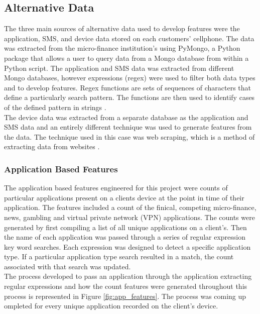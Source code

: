 \subsection{Alternative Data}

The three main sources of alternative data used to develop features were the application, SMS, and device data stored on each customers' cellphone. The data was extracted from the micro-finance institution's using PyMongo, a Python package that allows a user to query data from a Mongo database from within a Python script. The application and SMS data was extracted from different Mongo databases, however expressions (regex) were used to filter both data types and to develop features. Regex functions are sets of sequences of characters that define a particularly search pattern. The functions are then used to identify cases of the defined pattern in strings \parencite{Regex}. \\

The device data was extracted from a separate database as the application and SMS data and an entirely different technique was used to generate features from the data. The technique used in this case was web scraping, which is a method of extracting data from websites \parencite{WebScraping}. 

\subsubsection{Application Based Features}

The application based features engineered for this project were counts of particular applications present on a clients device at the point in time of their application. The features included a count of the finical, competing micro-finance, news, gambling and virtual private network (VPN) applications. The counts were generated by first compiling a list of all unique applications on a client's. Then the name of each application was passed through a series of regular expression key word searches. Each expression was designed to detect a specific application type. If  a particular application type search resulted in a match, the count associated with that search was updated. \\

The process developed to pass an application through the application extracting regular expressions and how the count features were generated throughout this process is represented in Figure \ref{fig:app_features}. The process was coming up ompleted for every unique application recorded on the client's device. 


